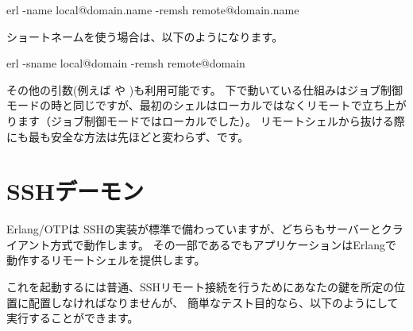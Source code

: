 \begin{VerbatimText}
erl -name local@domain.name -remsh remote@domain.name
\end{VerbatimText}

ショートネームを使う場合は、以下のようになります。

\begin{VerbatimText}
erl -sname local@domain -remsh remote@domain
\end{VerbatimText}

その他の引数(例えば  や )も利用可能です。
下で動いている仕組みはジョブ制御モードの時と同じですが、最初のシェルはローカルではなくリモートで立ち上がります（ジョブ制御モードではローカルでした）。
リモートシェルから抜ける際にも最も安全な方法は先ほどと変わらず、です。

\section{SSHデーモン}

Erlang/OTPは SSHの実装が標準で備わっていますが、どちらもサーバーとクライアント方式で動作します。
その一部であるでもアプリケーションはErlangで動作するリモートシェルを提供します。%

これを起動するには普通、SSHリモート接続を行うためにあなたの鍵を所定の位置に配置しなければなりませんが、
簡単なテスト目的なら、以下のようにして実行することができます。


